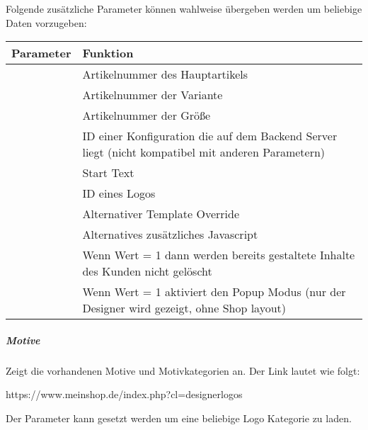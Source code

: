 \documentclass[letterpaper,10pt,ngerman]{sphinxmanual}
\begin{document}
Folgende zusätzliche Parameter können wahlweise übergeben werden um beliebige Daten vorzugeben:


\begin{savenotes}\sphinxattablestart
\centering
\begin{tabulary}{\linewidth}[t]{|T|T|}
\hline
\sphinxstyletheadfamily 
Parameter
&\sphinxstyletheadfamily 
Funktion
\\
\hline
{}
&
Artikelnummer des Hauptartikels
\\
\hline
{}
&
Artikelnummer der Variante
\\
\hline
{}
&
Artikelnummer der Größe
\\
\hline
{}
&
ID einer Konfiguration die auf dem Backend Server liegt (nicht kompatibel mit anderen Parametern)
\\
\hline
{}
&
Start Text
\\
\hline
{}
&
ID eines Logos
\\
\hline
{}
&
Alternativer Template Override
\\
\hline
{}
&
Alternatives zusätzliches Javascript
\\
\hline
{}
&
Wenn Wert = 1 dann werden bereits gestaltete Inhalte des Kunden nicht gelöscht
\\
\hline
{}
&
Wenn Wert = 1 aktiviert den Popup Modus (nur der Designer wird gezeigt, ohne Shop layout)
\\
\hline
\end{tabulary}
\par
\sphinxattableend\end{savenotes}


\subparagraph{Motive}
\label{\detokenize{modules/oxid/usage:motive}}
Zeigt die vorhandenen Motive und Motivkategorien an. Der Link lautet wie folgt:

\begin{sphinxVerbatim}[commandchars=\\\{\}]
https://www.mein\PYGZhy{}shop.de/index.php?cl=designer\PYGZus{}logos
\end{sphinxVerbatim}

Der Parameter  kann gesetzt werden um eine beliebige Logo Kategorie zu laden.
\end{document}
